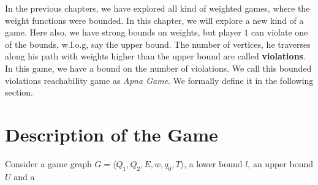 In the previous chapters, we have explored all kind of weighted games, where the weight functions were bounded. In this chapter, we will explore a new kind of a game. Here also, we have strong bounds on weights, but player $1$ can violate one of the bounds, w.l.o.g, say the upper bound. The number of vertices, he traverses along his path with weights higher than the upper bound are called \textbf{violations}. In this game, we have a bound on the number of violations. We call this bounded violations reachability game as \textit{Apna Game}. We formally define it in the following section.\\

\section{Description of the Game}
Consider a game graph $G=\langle Q_1, Q_2, E, w, q_0, T \rangle$, a lower bound $l$, an upper bound $U$ and a 